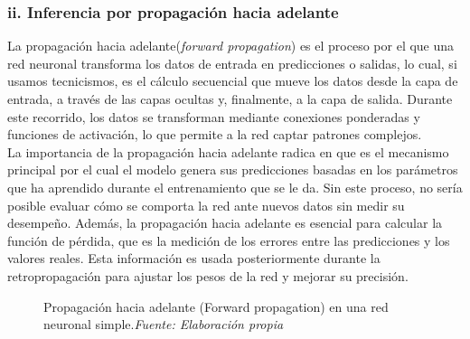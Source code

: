 \documentclass[11pt]{article} %
\begin{document}
\subsubsection{ii. Inferencia por propagación hacia adelante}
La propagación hacia adelante(\textit{forward propagation}) es el proceso por el que una red neuronal transforma los datos de entrada en predicciones o salidas, lo cual, si usamos tecnicismos, es el cálculo secuencial que mueve los datos desde la capa de entrada, a través de las capas ocultas y, finalmente, a la capa de salida. Durante este recorrido, los datos se transforman mediante conexiones ponderadas y funciones de activación, lo que permite a la red captar patrones complejos. \\
La importancia de la propagación hacia adelante radica en que es el mecanismo principal por el cual el modelo genera sus predicciones basadas en los parámetros que ha aprendido durante el entrenamiento que se le da. Sin este proceso, no sería posible evaluar cómo se comporta la red ante nuevos datos sin medir su desempeño. Además, la propagación hacia adelante es esencial para calcular la función de pérdida, que es la medición de los errores entre las predicciones y los valores reales. Esta información es usada posteriormente durante la retropropagación  para ajustar los pesos de la red y mejorar su precisión.
\begin{figure}[H]
    \centering
    \caption{Propagación hacia adelante (Forward propagation) en una red neuronal simple.\textit{Fuente: Elaboración propia}}
    \label{fig:forward_propagation}
\end{figure}
\end{document}
